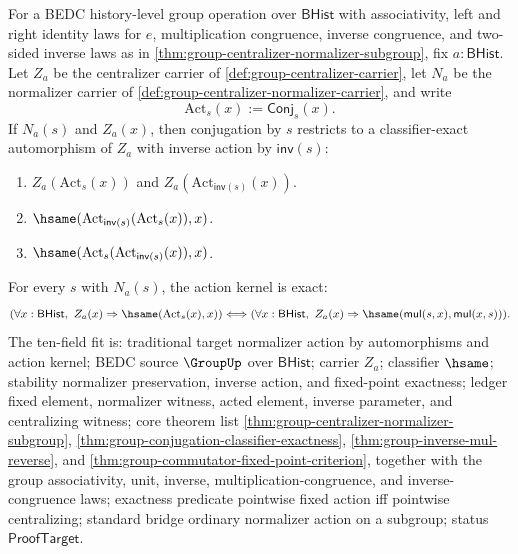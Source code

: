 \begin{theorem}
\label{thm:group-centralizer-normalizer-action-automorphism-kernel-exactness}
For a BEDC history-level group operation over $\mathsf{BHist}$ with
associativity, left and right identity laws for $e$, multiplication
congruence, inverse congruence, and two-sided inverse laws as in
\autoref{thm:group-centralizer-normalizer-subgroup}, fix
$a:\mathsf{BHist}$. Let $Z_a$ be the centralizer carrier of
\autoref{def:group-centralizer-carrier}, let $N_a$ be the normalizer carrier of
\autoref{def:group-centralizer-normalizer-carrier}, and write
$$
\mathrm{Act}_s(x):=\mathsf{Conj}_s(x).
$$
If $N_a(s)$ and $Z_a(x)$, then conjugation by $s$ restricts to a
classifier-exact automorphism of $Z_a$ with inverse action by
$\mathsf{inv}(s)$:
\begin{enumerate}
\item $Z_a(\mathrm{Act}_s(x))$ and
$Z_a(\mathrm{Act}_{\mathsf{inv}(s)}(x))$.
\item $\hsame(\mathrm{Act}_{\mathsf{inv}(s)}(\mathrm{Act}_s(x)),x)$.
\item $\hsame(\mathrm{Act}_s(\mathrm{Act}_{\mathsf{inv}(s)}(x)),x)$.
\end{enumerate}
For every $s$ with $N_a(s)$, the action kernel is exact:
$$
(\forall x:\mathsf{BHist},\ Z_a(x)\Rightarrow
\hsame(\mathrm{Act}_s(x),x))
\Longleftrightarrow
(\forall x:\mathsf{BHist},\ Z_a(x)\Rightarrow
\hsame(\mathsf{mul}(s,x),\mathsf{mul}(x,s))).
$$
The ten-field fit is: traditional target normalizer action by automorphisms
and action kernel; BEDC source $\GroupUp$ over $\mathsf{BHist}$; carrier
$Z_a$; classifier $\hsame$; stability normalizer preservation, inverse
action, and fixed-point exactness; ledger fixed element, normalizer witness,
acted element, inverse parameter, and centralizing witness; core theorem list
\autoref{thm:group-centralizer-normalizer-subgroup},
\autoref{thm:group-conjugation-classifier-exactness},
\autoref{thm:group-inverse-mul-reverse}, and
\autoref{thm:group-commutator-fixed-point-criterion}, together with the group
associativity, unit, inverse, multiplication-congruence, and
inverse-congruence laws; exactness predicate pointwise fixed action iff
pointwise centralizing; standard bridge ordinary normalizer action on a
subgroup; status $\mathsf{ProofTarget}$.
\end{theorem}
